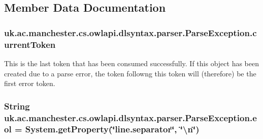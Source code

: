 \subsection{Member Data Documentation}
\hypertarget{classuk_1_1ac_1_1manchester_1_1cs_1_1owlapi_1_1dlsyntax_1_1parser_1_1_parse_exception_a77cb9a5a197a595304a92f835f6ab8e8}{
\subsubsection[{current\-Token}]{ uk.\-ac.\-manchester.\-cs.\-owlapi.\-dlsyntax.\-parser.\-Parse\-Exception.\-current\-Token}}\label{classuk_1_1ac_1_1manchester_1_1cs_1_1owlapi_1_1dlsyntax_1_1parser_1_1_parse_exception_a77cb9a5a197a595304a92f835f6ab8e8}
This is the last token that has been consumed successfully. If this object has been created due to a parse error, the token followng this token will (therefore) be the first error token. \hypertarget{classuk_1_1ac_1_1manchester_1_1cs_1_1owlapi_1_1dlsyntax_1_1parser_1_1_parse_exception_a098af97940c05110614cd947aea31c91}{
\subsubsection[{eol}]{\setlength{\rightskip}{0pt plus 5cm}String uk.\-ac.\-manchester.\-cs.\-owlapi.\-dlsyntax.\-parser.\-Parse\-Exception.\-eol = System.\-get\-Property(\char`\"{}line.\-separator\char`\"{}, \char`\"{}\textbackslash{}n\char`\"{})\hspace{0.3cm}{\ttfamily [protected]}}}\label{classuk_1_1ac_1_1manchester_1_1cs_1_1owlapi_1_1dlsyntax_1_1parser_1_1_parse_exception_a098af97940c05110614cd947aea31c91}

